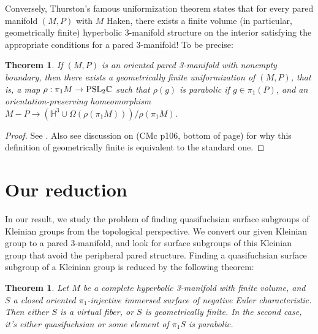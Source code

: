 \documentclass[12pt]{amsart}
\newtheorem{thm}[theorem]{Theorem}
\theoremstyle{definition}
\theoremstyle{remark}
\newcommand{\Om}{\Omega}
\begin{document}
Conversely, Thurston's famous uniformization theorem states that for every
pared manifold $(M,P)$ with $M$ Haken, there exists a finite volume (in
particular, geometrically finite) hyperbolic 3-manifold structure on the
interior satisfying the appropriate conditions for a pared 3-manifold! To be
precise:



\begin{thm}

If $(M,P)$ is an oriented pared 3-manifold with nonempty boundary, then
there exists a geometrically finite uniformization of $(M,P)$, that is, a map
$\rho: \pi_1M \to \mbox{\rm{PSL}}_2\mathbb{C}$ such that $\rho(g)$ is parabolic
if $g \in \pi_1(P)$, and an orientation-preserving homeomorphism $M-P \to
\left(\mathbb{H}^3 \cup \Om(\rho(\pi_1M))\right)/\rho(\pi_1M)$.

\end{thm}
\begin{proof}

See \cite{CMc}.
Also see discussion on (CMc p106, bottom of page) for why this definition of
geometrically finite is equivalent to the standard one.

\end{proof}


\section{Our reduction}

In our result, we study the problem of finding quasifuchsian surface subgroups
of Kleinian groups from the topological perspective. We convert our given
Kleinian group to a pared 3-manifold, and look for surface subgroups of this
Kleinian group that avoid the peripheral pared structure. Finding
a quasifuchsian surface subgroup of a Kleinian group is reduced by the
following theorem:

\begin{thm}

Let $M$ be a complete hyperbolic 3-manifold with finite volume, and $S$
a closed oriented $\pi_1$-injective immersed surface of negative Euler
characteristic. Then either $S$ is a virtual fiber, or $S$ is geometrically
finite. In the second case, it's either quasifuchsian or some element of
$\pi_1S$ is parabolic.

\end{thm}
\end{document}

